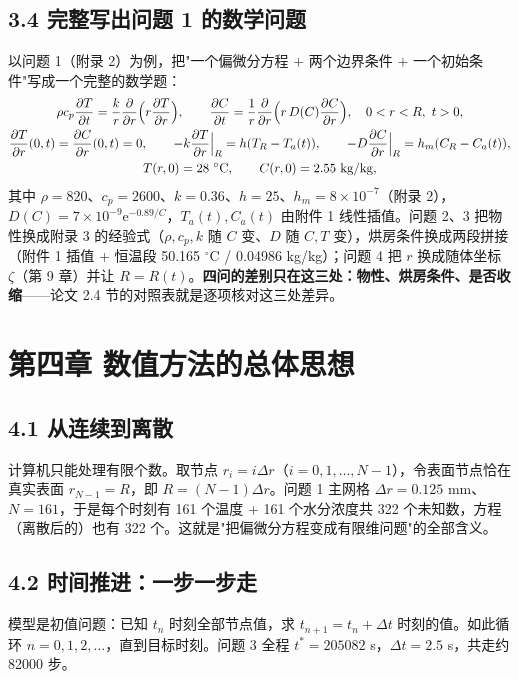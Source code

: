 \documentclass[12pt,a4paper]{ctexart}
\newcommand{\pdd}[2]{\dfrac{\partial #1}{\partial #2}}
\begin{document}
\subsection{3.4 完整写出问题 1 的数学问题}

以问题 1（附录 2）为例，把"一个偏微分方程 $+$ 两个边界条件 $+$ 一个初始条件"写成一个完整的数学题：
\begin{gather}
\rho c_p\pdd{T}{t}=\frac{k}{r}\pdd{}{r}\Bigl(r\pdd{T}{r}\Bigr),\qquad
\pdd{C}{t}=\frac{1}{r}\pdd{}{r}\Bigl(r\,D(C)\pdd{C}{r}\Bigr), \quad 0<r<R,\ t>0,\\
\pdd{T}{r}(0,t)=\pdd{C}{r}(0,t)=0,\qquad
-k\pdd{T}{r}\Big|_{R}=h(T_R-T_a(t)),\qquad
-D\pdd{C}{r}\Big|_{R}=h_m(C_R-C_a(t)),\\
T(r,0)=28\ ^\circ\mathrm{C},\qquad C(r,0)=2.55\ \mathrm{kg/kg},
\end{gather}
其中 $\rho=820$、$c_p=2600$、$k=0.36$、$h=25$、$h_m=8\times10^{-7}$（附录 2），$D(C)=7\times10^{-9}\mathrm{e}^{-0.89/C}$，$T_a(t),C_a(t)$ 由附件 1 线性插值。问题 2、3 把物性换成附录 3 的经验式（$\rho,c_p,k$ 随 $C$ 变、$D$ 随 $C,T$ 变），烘房条件换成两段拼接（附件 1 插值 + 恒温段 50.165 $^\circ$C / 0.04986 kg/kg）；问题 4 把 $r$ 换成随体坐标 $\zeta$（第 9 章）并让 $R=R(t)$。\textbf{四问的差别只在这三处：物性、烘房条件、是否收缩}——论文 2.4 节的对照表就是逐项核对这三处差异。

\section{第四章 数值方法的总体思想}

\subsection{4.1 从连续到离散}

计算机只能处理有限个数。取节点 $r_i=i\Delta r$（$i=0,1,\dots,N-1$），令表面节点恰在真实表面 $r_{N-1}=R$，即 $R=(N-1)\Delta r$。问题 1 主网格 $\Delta r=0.125$ mm、$N=161$，于是每个时刻有 161 个温度 + 161 个水分浓度共 322 个未知数，方程（离散后的）也有 322 个。这就是"把偏微分方程变成有限维问题"的全部含义。

\subsection{4.2 时间推进：一步一步走}

模型是初值问题：已知 $t_n$ 时刻全部节点值，求 $t_{n+1}=t_n+\Delta t$ 时刻的值。如此循环 $n=0,1,2,\dots$，直到目标时刻。问题 3 全程 $t^*=205082$ s，$\Delta t=2.5$ s，共走约 82000 步。
\end{document}
